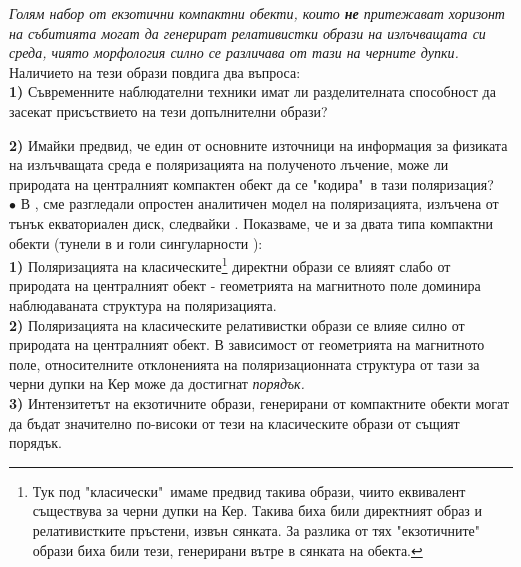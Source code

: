 \emph{Голям набор от екзотични компактни обекти, които \textbf{не} притежават хоризонт на събитията могат да генерират релативистки образи на излъчващата си среда, чиято морфология силно се различава от тази на черните дупки.}\\

\noindent Наличието на тези образи повдига два въпроса:\\

\noindent\textbf{1)} Съвременните наблюдателни техники имат ли разделителната способност да засекат присъствието на тези допълнителни образи?\newline

\noindent\textbf{2)} Имайки предвид, че един от основните източници на информация за физиката на излъчващата среда е поляризацията на полученото лъчение, може ли природата на централният компактен обект да се "кодира"$\,$ в тази поляризация?\\\newline
$\bullet$ В \cite{Delijski2022}, \cite{Deliyski2023} сме разгледали опростен аналитичен модел на поляризацията, излъчена от тънък екваториален диск, следвайки \cite{Narayan2021}. Показваме, че и за двата типа компактни обекти (тунели в \cite{Delijski2022} и голи сингуларности \cite{Deliyski2023}):\\\newline
\textbf{1)} Поляризацията на класическите\footnote{Тук под "класически"$\,$ имаме предвид такива образи, чиито еквивалент съществува за черни дупки на Кер. Такива биха били директният образ и релативистките пръстени, извън сянката. За разлика от тях "екзотичните"$\,$ образи биха били тези, генерирани вътре в сянката на обекта.} директни образи се влияят слабо от природата на централният обект - геометрията на магнитното поле доминира наблюдаваната структура на поляризацията.\\\newline
\textbf{2)} Поляризацията на класическите релативистки образи се влияе силно от природата на централният обект. В зависимост от геометрията на магнитното поле, относителните отклоненията на поляризационната структура от тази за черни дупки на Кер може да достигнат 
\emph{порядък.}\\\newline
\textbf{3)} Интензитетът на екзотичните образи, генерирани от компактните обекти могат да бъдат значително по-високи от тези на класическите образи от същият порядък.\\\newline
